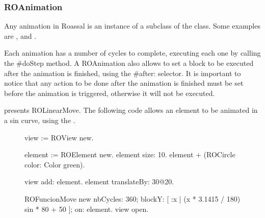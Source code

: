 \documentclass[a4paper,10pt,twoside]{book}
\begin{document}
%
%

\subsubsection*{ROAnimation}


Any animation in Roassal is an instance of a subclass of the  class. Some examples are ,  and .

Each animation has a number of cycles to complete, executing each one by calling the \#doStep method.
A ROAnimation also allows to set a block to be executed after the animation is finished, using the \#after: selector. It is important to notice that any action to be done after the animation is finished must be set before the animation is triggered, otherwise it will not be executed.

 presents ROLinearMove. The following code allows an element to be animated in a sin curve, using the .

\begin{figure}[H]
\begin{code}{}
view := ROView new.

element := ROElement new.
element size: 10.
element + (ROCircle color: Color green).

view add: element.
element translateBy: 30@20.

ROFuncionMove new
	nbCycles: 360;
	blockY: [ :x | (x * 3.1415 / 180) sin * 80 + 50 ];
	on: element.
view open.
\end{code}
\end{figure}
\end{document}

